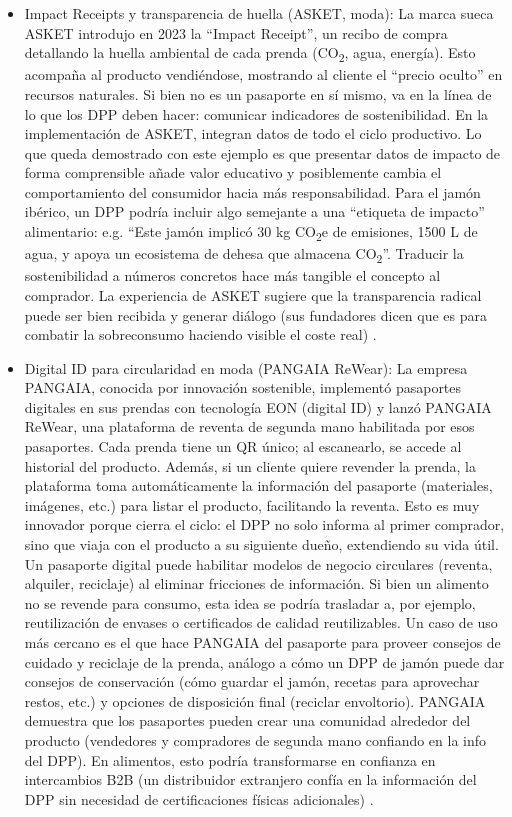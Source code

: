 \begin{itemize}
    \item Impact Receipts y transparencia de huella (ASKET, moda): La marca sueca ASKET introdujo en 2023 la “Impact Receipt”, un recibo de compra detallando la huella ambiental de cada prenda (CO\textsubscript{2}, agua, energía). Esto acompaña al producto vendiéndose, mostrando al cliente el “precio oculto” en recursos naturales. Si bien no es un pasaporte en sí mismo, va en la línea de lo que los DPP deben hacer: comunicar indicadores de sostenibilidad. En la implementación de ASKET, integran datos de todo el ciclo productivo. Lo que queda demostrado con este ejemplo es que presentar datos de impacto de forma comprensible añade valor educativo y posiblemente cambia el comportamiento del consumidor hacia más responsabilidad. Para el jamón ibérico, un DPP podría incluir algo semejante a una “etiqueta de impacto” alimentario: e.g. “Este jamón implicó 30 kg CO\textsubscript{2}e de emisiones, 1500 L de agua, y apoya un ecosistema de dehesa que almacena CO\textsubscript{2}”. Traducir la sostenibilidad a números concretos hace más tangible el concepto al comprador. La experiencia de ASKET sugiere que la transparencia radical puede ser bien recibida y generar diálogo (sus fundadores dicen que es para combatir la sobreconsumo haciendo visible el coste real) \cite{noauthor_10_nodate}.
    \item Digital ID para circularidad en moda (PANGAIA ReWear): La empresa PANGAIA, conocida por innovación sostenible, implementó pasaportes digitales en sus prendas con tecnología EON (digital ID) y lanzó PANGAIA ReWear, una plataforma de reventa de segunda mano habilitada por esos pasaportes. Cada prenda tiene un QR único; al escanearlo, se accede al historial del producto. Además, si un cliente quiere revender la prenda, la plataforma toma automáticamente la información del pasaporte (materiales, imágenes, etc.) para listar el producto, facilitando la reventa. Esto es muy innovador porque cierra el ciclo: el DPP no solo informa al primer comprador, sino que viaja con el producto a su siguiente dueño, extendiendo su vida útil. Un pasaporte digital puede habilitar modelos de negocio circulares (reventa, alquiler, reciclaje) al eliminar fricciones de información. Si bien un alimento no se revende para consumo, esta idea se podría trasladar a, por ejemplo, reutilización de envases o certificados de calidad reutilizables. Un caso de uso más cercano es el que hace PANGAIA del pasaporte para proveer consejos de cuidado y reciclaje de la prenda, análogo a cómo un DPP de jamón puede dar consejos de conservación (cómo guardar el jamón, recetas para aprovechar restos, etc.) y opciones de disposición final (reciclar envoltorio). PANGAIA demuestra que los pasaportes pueden crear una comunidad alrededor del producto (vendedores y compradores de segunda mano confiando en la info del DPP). En alimentos, esto podría transformarse en confianza en intercambios B2B (un distribuidor extranjero confía en la información del DPP sin necesidad de certificaciones físicas adicionales) \cite{noauthor_10_nodate}.

\end{itemize}
